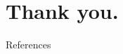 
\section*{Thank you.}

\appendix


\begingroup
    \renewcommand{\section}[2]{}%
    \begin{frame}[allowframebreaks]{References}
		\bibliographytrue
        \def\bibfont{\footnotesize}
		\Wider{
			
		}
    \end{frame}
\endgroup
